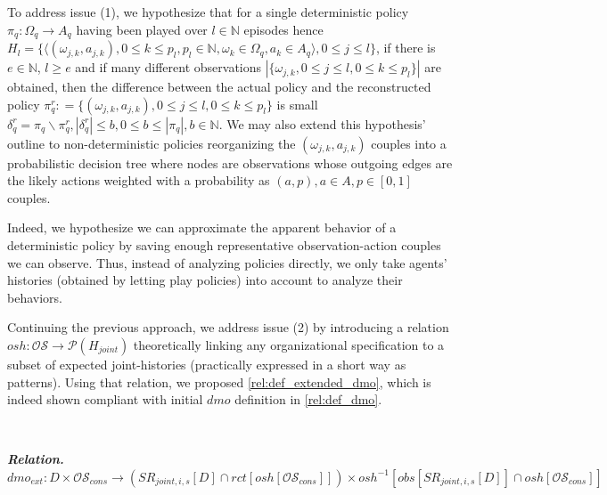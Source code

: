 \documentclass[doubleblind]{ecai}
\newcounter{relation}
\renewcommand{\therelation}{\arabic{relation}}
\newenvironment{relation}[1][]{%
    \refstepcounter{relation}%
    \noindent \raggedright \textit{\textbf{Relation. \therelation}} \hfill$}
{%
$ \hfill \phantom{x}

}
\newcounter{proof}
\begin{document}
To address issue (1), we hypothesize that for a single deterministic policy $\pi_q: \Omega_q \rightarrow A_q$ having been played over $l \in \mathbb{N}$ episodes hence $H_l = \{\langle (\omega_{j,k}, a_{j,k}), 0 \leq k \leq p_l, p_l \in \mathbb{N}, \omega_k \in \Omega_q, a_k \in A_q \rangle, 0 \leq j \leq l\}$, if there is $e \in \mathbb{N}$, $l \geq e$ and if many different observations $|\{\omega_{j,k}, 0 \leq j \leq l, 0 \leq k \leq p_l\}|$ are obtained, then the difference between the actual policy and the reconstructed policy $\pi_q^r: = \{(\omega_{j,k}, a_{j,k}), 0 \leq j \leq l, 0 \leq k \leq p_l\}$ is small $\delta_q^r = \pi_q \backslash \pi_q^r, |\delta_q^r| \leq b, 0 \leq b \leq |\pi_q|, b \in \mathbb{N}$. We may also extend this hypothesis' outline to non-deterministic policies reorganizing the $(\omega_{j,k}, a_{j,k})$ couples into a probabilistic decision tree where nodes are observations whose outgoing edges are the likely actions weighted with a probability as $(a, p), a \in A, p \in [0,1]$ couples.

Indeed, we hypothesize we can approximate the apparent behavior of a deterministic policy by saving enough representative observation-action couples we can observe. Thus, instead of analyzing policies directly, we only take agents' histories (obtained by letting play policies) into account to analyze their behaviors.

Continuing the previous approach, we address issue (2) by introducing a relation $osh: \mathcal{OS} \rightarrow \mathcal{P}(H_{joint})$ theoretically linking any organizational specification to a subset of expected joint-histories (practically expressed in a short way as patterns).
Using that relation, we proposed \autoref{rel:def_extended_dmo}, which is indeed shown compliant with initial $dmo$ definition in \autoref{rel:def_dmo}\footnotemark[1].%


\

\begin{relation}\label{rel:def_extended_dmo}
    $\\\phantom{}$ dmo_{ext}: D \times \mathcal{OS}_{cons} \rightarrow (SR_{joint,i,s}[D] \cap rct[osh[\mathcal{OS}_{cons}]]) \times osh^{-1}[obs[SR_{joint,i,s}[D]] \cap osh[\mathcal{OS}_{cons}]]
\end{relation}
\end{document}
